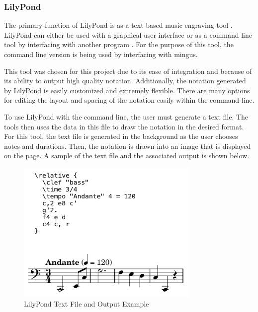 \subsubsection{LilyPond}
\label{subsubsec:lilypond}

The primary function of LilyPond is as a text-based music engraving tool \cite{LilyPond_2020}.  LilyPond can either be used with a graphical user interface or as a command line tool by interfacing with another program \cite{LilyPond_2020}.  For the purpose of this tool, the command line version is being used by interfacing with mingus.

\vspace{\baselineskip}

This tool was chosen for this project due to its ease of integration and because of its ability to output high quality notation.  Additionally, the notation generated by LilyPond is easily customized and extremely flexible.  There are many options for editing the layout and spacing of the notation easily within the command line.

\vspace{\baselineskip}

To use LilyPond with the command line, the user must generate a text file.  The tools then uses the data in this file to draw the notation in the desired format.  For this tool, the text file is generated in the background as the user chooses notes and durations.  Then, the notation is drawn into an image that is displayed on the page.  A sample of the text file and the associated output is shown below.

\begin{figure}[!htbp]
	\centering
	\caption{LilyPond Text File and Output Example \cite{LilyPond_2020}}
	\includegraphics[scale=0.75]{images/lilypondExample.png}
\end{figure}

